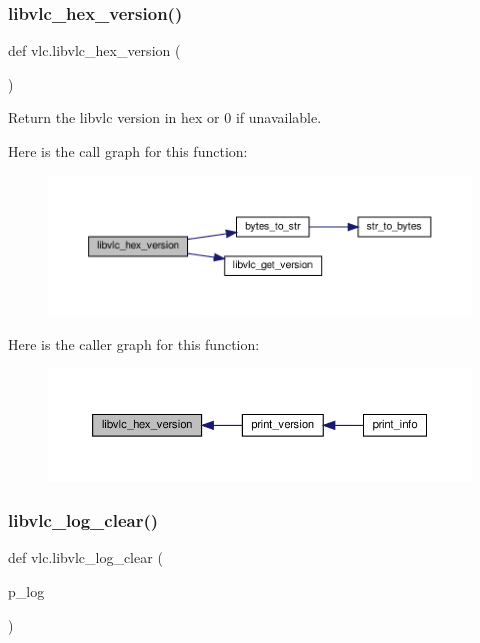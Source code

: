 \subsubsection{\texorpdfstring{libvlc\+\_\+hex\+\_\+version()}{libvlc\_hex\_version()}}
{\footnotesize\ttfamily def vlc.\+libvlc\+\_\+hex\+\_\+version (\begin{DoxyParamCaption}{ }\end{DoxyParamCaption})}

\begin{DoxyVerb}Return the libvlc version in hex or 0 if unavailable.
\end{DoxyVerb}
 Here is the call graph for this function\+:
\nopagebreak
\begin{figure}[H]
\begin{center}
\leavevmode
\includegraphics[width=350pt]{namespacevlc_a53e26e809dfb7c1f1a1f25d5e0530472_cgraph}
\end{center}
\end{figure}
Here is the caller graph for this function\+:
\nopagebreak
\begin{figure}[H]
\begin{center}
\leavevmode
\includegraphics[width=350pt]{namespacevlc_a53e26e809dfb7c1f1a1f25d5e0530472_icgraph}
\end{center}
\end{figure}
\mbox{\label{namespacevlc_a1cc8217001030138b1f0ada005ce72d9}} 
\subsubsection{\texorpdfstring{libvlc\+\_\+log\+\_\+clear()}{libvlc\_log\_clear()}}
{\footnotesize\ttfamily def vlc.\+libvlc\+\_\+log\+\_\+clear (\begin{DoxyParamCaption}\item[{}]{p\+\_\+log }\end{DoxyParamCaption})}

